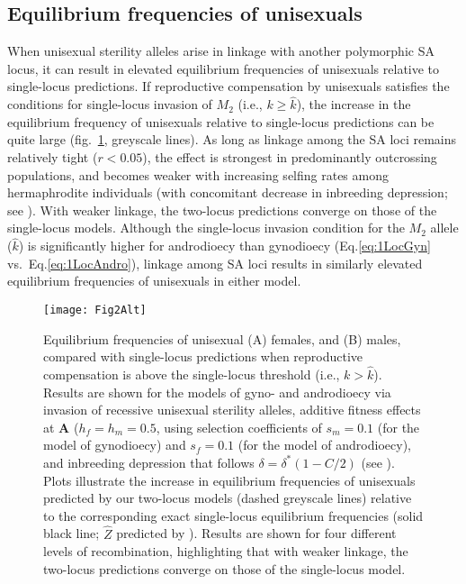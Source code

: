 \documentclass[9pt,twocolumn,twoside,lineno]{gsajnl}
\begin{document}
\subsection{Equilibrium frequencies of unisexuals}

When unisexual sterility alleles arise in linkage with another polymorphic SA locus, it can result in elevated equilibrium frequencies of unisexuals relative to single-locus predictions. If reproductive compensation by unisexuals satisfies the conditions for single-locus invasion of $M_2$ (i.e., $k \geq \hat{k}$), the increase in the equilibrium frequency of unisexuals relative to single-locus predictions can be quite large (fig.~\ref{fig:eqFreq2v1Loc}, greyscale lines). As long as linkage among the SA loci remains relatively tight ($r < 0.05$), the effect is strongest in predominantly outcrossing populations, and becomes weaker with increasing selfing rates among hermaphrodite individuals (with concomitant decrease in inbreeding depression; see ). With weaker linkage, the two-locus predictions converge on those of the single-locus models. Although the single-locus invasion condition for the $M_2$ allele ($\hat{k}$) is significantly higher for androdioecy than gynodioecy (Eq.\ref{eq:1LocGyn} vs.~Eq.\ref{eq:1LocAndro}), linkage among SA loci results in similarly elevated equilibrium frequencies of unisexuals in either model.

\begin{figure}[htbp]
\centering
\texttt{[image: Fig2Alt]}
\caption{Equilibrium frequencies of unisexual (A) females, and (B) males, compared with single-locus predictions when reproductive compensation is above the single-locus threshold (i.e., $k > \hat{k}$). Results are shown for the models of gyno- and androdioecy via invasion of recessive unisexual sterility alleles, additive fitness effects at $\mathbf{A}$ ($h_f = h_m = 0.5$, using selection coefficients of $s_m = 0.1$ (for the model of gynodioecy) and $s_f = 0.1$ (for the model of androdioecy), and inbreeding depression that follows $\delta = \delta^\ast(1 - C/2)$ (see ). Plots illustrate the increase in equilibrium frequencies of unisexuals predicted by our two-locus models (dashed greyscale lines) relative to the corresponding exact single-locus equilibrium frequencies (solid black line; $\hat{Z}$ predicted by \citealt{Charlesworth1978a}). Results are shown for four different levels of recombination, highlighting that with weaker linkage, the two-locus predictions converge on those of the single-locus model.}
\label{fig:eqFreq2v1Loc}
\end{figure}
\end{document}
